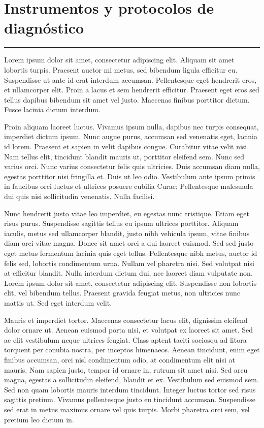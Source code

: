 \appendix{}

\chapter{Instrumentos y protocolos de diagnóstico} \label{aped:A_instrumentos}
\vspace{-3ex}%
\noindent
\rule{\textwidth}{1pt}
\vspace{-2ex}%

Lorem ipsum dolor sit amet, consectetur adipiscing elit. Aliquam sit amet lobortis turpis. Praesent auctor mi metus, sed bibendum ligula efficitur eu. Suspendisse ut ante id erat interdum accumsan. Pellentesque eget hendrerit eros, et ullamcorper elit. Proin a lacus et sem hendrerit efficitur. Praesent eget eros sed tellus dapibus bibendum sit amet vel justo. Maecenas finibus porttitor dictum. Fusce lacinia dictum interdum.

Proin aliquam laoreet luctus. Vivamus ipsum nulla, dapibus nec turpis consequat, imperdiet dictum ipsum. Nunc augue purus, accumsan sed venenatis eget, lacinia id lorem. Praesent et sapien in velit dapibus congue. Curabitur vitae velit nisi. Nam tellus elit, tincidunt blandit mauris ut, porttitor eleifend sem. Nunc sed varius orci. Nunc varius consectetur felis quis ultricies. Duis accumsan diam nulla, egestas porttitor nisi fringilla et. Duis ut leo odio. Vestibulum ante ipsum primis in faucibus orci luctus et ultrices posuere cubilia Curae; Pellentesque malesuada dui quis nisi sollicitudin venenatis. Nulla facilisi.

Nunc hendrerit justo vitae leo imperdiet, eu egestas nunc tristique. Etiam eget risus purus. Suspendisse sagittis tellus eu ipsum ultrices porttitor. Aliquam iaculis, metus sed ullamcorper blandit, justo nibh vehicula ipsum, vitae finibus diam orci vitae magna. Donec sit amet orci a dui laoreet euismod. Sed sed justo eget metus fermentum lacinia quis eget tellus. Pellentesque nibh metus, auctor id felis sed, lobortis condimentum urna. Nullam vel pharetra nisi. Sed volutpat nisi at efficitur blandit. Nulla interdum dictum dui, nec laoreet diam vulputate non. Lorem ipsum dolor sit amet, consectetur adipiscing elit. Suspendisse non lobortis elit, vel bibendum tellus. Praesent gravida feugiat metus, non ultricies nunc mattis ut. Sed eget interdum velit.

Mauris et imperdiet tortor. Maecenas consectetur lacus elit, dignissim eleifend dolor ornare ut. Aenean euismod porta nisi, et volutpat ex laoreet sit amet. Sed ac elit vestibulum neque ultrices feugiat. Class aptent taciti sociosqu ad litora torquent per conubia nostra, per inceptos himenaeos. Aenean tincidunt, enim eget finibus accumsan, orci nisl condimentum odio, at condimentum elit nisi at mauris. Nam sapien justo, tempor id ornare in, rutrum sit amet nisi. Sed arcu magna, egestas a sollicitudin eleifend, blandit et ex. Vestibulum sed euismod sem. Sed non quam lobortis mauris interdum tincidunt. Integer luctus tortor sed risus sagittis pretium. Vivamus pellentesque justo eu tincidunt accumsan. Suspendisse sed erat in metus maximus ornare vel quis turpis. Morbi pharetra orci sem, vel pretium leo dictum in.

